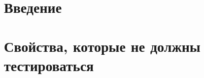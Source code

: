 \documentclass[a4paper,12pt]{article}
\date{}
\begin{document}
	\section{Введение}

	\section{Свойства, которые не должны тестироваться}
\end{document}
